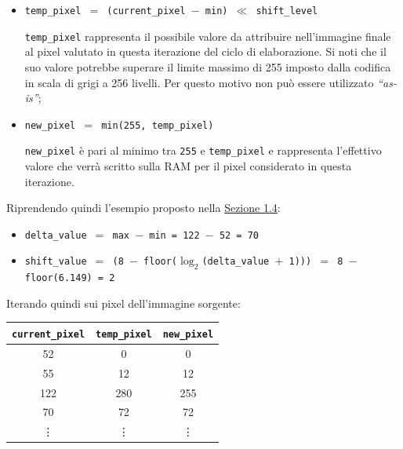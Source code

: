 \documentclass{article}
\begin{document}
\begin{itemize}
    \item   \texttt{temp\_pixel $=$ (current\_pixel $-$ min) $\ll$ shift\_level}\par
            \texttt{temp\_pixel} rappresenta il possibile valore da attribuire nell’immagine finale al pixel valutato in questa iterazione del ciclo di elaborazione. Si noti che il suo valore potrebbe superare il limite massimo di 255 imposto dalla codifica in scala di grigi a 256 livelli. Per questo motivo non può essere utilizzato \emph{“as-is”};
    \item   \texttt{new\_pixel $=$ min(255, temp\_pixel)}\par
            \texttt{new\_pixel} è pari al minimo tra \texttt{255} e \texttt{temp\_pixel} e rappresenta l’effettivo valore che verrà scritto sulla RAM per il pixel considerato in questa iterazione.
\end{itemize}

Riprendendo quindi l'esempio proposto nella \hyperref[sec:esempio]{Sezione 1.4}:
\begin{itemize}
    \item   \texttt{delta\_value $=$ max $-$ min = 122 $-$ 52 = 70}
    \item   \texttt{shift\_value $=$ (8 $-$ floor($\log_{2} $(delta\_value $+$ 1))) $=$ 8 $-$ floor(6.149) = 2}
\end{itemize}

Iterando quindi sui pixel dell'immagine sorgente:
\begin{center}
    \small
    \def\arraystretch{1.2} %
    \begin{tabular}{||c|c|c||}
        \hline
        \texttt{current\_pixel} & \texttt{temp\_pixel} & \texttt{new\_pixel} \\
        \hline \hline
        52                      & 0                    & 0                   \\\hline
        55                      & 12                   & 12                  \\\hline
        122                     & 280                  & 255                 \\\hline
        70                      & 72                   & 72                  \\\hline
        \vdots                  & \vdots               & \vdots              \\\hline
    \end{tabular}
\end{center}
\vspace{0,2cm}
\end{document}
